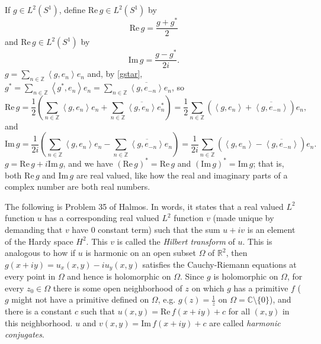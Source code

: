 \documentclass{article}
\newcommand{\inner}[2]{\left\langle #1, #2 \right\rangle}
\def\Re{\ensuremath{\mathrm{Re}}\,}
\def\Im{\ensuremath{\mathrm{Im}}\,}
\theoremstyle{definition}
\begin{document}
If $g \in L^2(S^1)$, define $\Re g \in L^2(S^1)$ by
\[
\Re g = \frac{g+g^*}{2}
\]
and $\Re g \in L^2(S^1)$ by
\[
\Im g = \frac{g-g^*}{2i}.
\]
$g = \sum_{n \in \mathbb{Z}} \inner{g}{e_n} e_n$ and, by \eqref{gstar}, $g^*=\sum_{n \in \mathbb{Z}} \inner{g^*}{e_n}e_n=\sum_{n \in \mathbb{Z}} \overline{\inner{g}{e_{-n}}} e_n$, so
\[
\Re g = \frac{1}{2} \left( \sum_{n \in \mathbb{Z}}  \inner{g}{e_n} e_n + \sum_{n \in \mathbb{Z}} \overline{\inner{g}{e_n}} e_n^* \right)
=\frac{1}{2} \sum_{n \in \mathbb{Z}} \left(  \inner{g}{e_n} +  \overline{\inner{g}{e_{-n}}} \right) e_n,
\]
and
\begin{equation}
\Im g = \frac{1}{2i} \left(  \sum_{n \in \mathbb{Z}} \inner{g}{e_n} e_n  -\sum_{n \in \mathbb{Z}} \overline{\inner{g}{e_{-n}}} e_n\right)
=\frac{1}{2i} \sum_{n \in \mathbb{Z}} \left(  \inner{g}{e_n} -  \overline{\inner{g}{e_{-n}}}\right) e_n.
\label{imfourier}
\end{equation}
$g = \Re g + i \Im g$, and we have $(\Re g)^*=\Re g$ and $(\Im g)^*=\Im g$; that is, both $\Re g$ and $\Im g$ are real valued, like how the real and imaginary parts of a complex number are both real numbers.


The following is Problem 35 of Halmos. In words, it states that a real valued $L^2$ function $u$ has a corresponding real valued $L^2$ function  $v$
(made unique by demanding that $v$ have $0$ constant term) such that the sum $u+iv$ is an element of the Hardy space $H^2$. This $v$ is called
the {\em Hilbert transform} of $u$. This is analogous to how if $u$ is
harmonic on an open subset $\Omega$ of $\mathbb{R}^2$, then $g(x+iy)=u_x(x,y)-iu_y(x,y)$ satisfies the Cauchy-Riemann equations at every point in $\Omega$ 
and hence is holomorphic on $\Omega$. Since $g$ is holomorphic on $\Omega$, for every $z_0 \in \Omega$ there is some open neighborhood of $z$ on which $g$ has a primitive
$f$ ($g$ might not have a primitive defined on $\Omega$, e.g. $g(z)=\frac{1}{z}$ on $\Omega=\mathbb{C} \setminus \{0\}$), and there is a constant $c$ such that $u(x,y)=\Re f(x+iy)+c$
for
all $(x,y)$ in this neighborhood. $u$ and $v(x,y)=\Im f(x+iy)+c$ are called {\em harmonic conjugates}.
\end{document}
